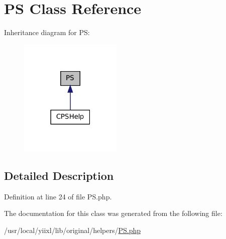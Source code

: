 \hypertarget{classPS}{
\section{PS Class Reference}
\label{classPS}
}


Inheritance diagram for PS:\nopagebreak
\begin{figure}[H]
\begin{center}
\leavevmode
\includegraphics[width=138pt]{classPS__inherit__graph}
\end{center}
\end{figure}


\subsection{Detailed Description}


Definition at line 24 of file PS.php.



The documentation for this class was generated from the following file:\begin{DoxyCompactItemize}
\item 
/usr/local/yiixl/lib/original/helpers/\hyperlink{PS_8php}{PS.php}\end{DoxyCompactItemize}
